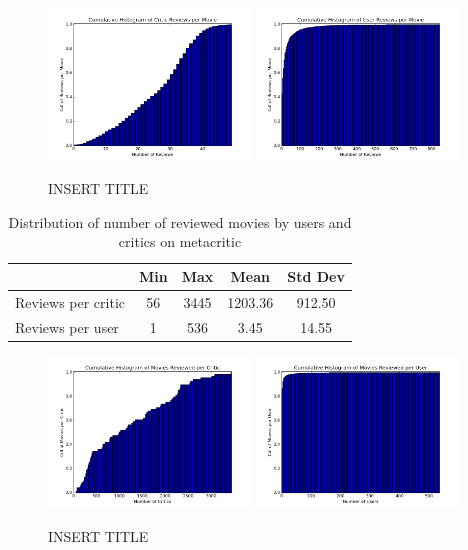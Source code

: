 \documentclass[12pt]{article}
\begin{document}
	 \begin{figure}[H]
	    \centering
	    \includegraphics[width=0.48\textwidth]{plots/plot_m_mov_top.png}
	    \includegraphics[width=0.48\textwidth]{plots/plot_m_mov_usr.png}
	    \caption{INSERT TITLE}
	    \label{fig:m_mov}
	\end{figure}


	\begin{table}[H]
	\centering
	 \caption{Distribution of number of reviewed movies by users and critics on metacritic}

	 \begin{tabular}{ l | c | c | c | c }
	 \hline
	 &  Min & Max & Mean & Std Dev  \\
	 \hline
	 Reviews per critic & 56 & 3445 & 1203.36 & 912.50 \\
	 Reviews per user & 1 & 536 & 3.45 & 14.55 \\
	 \hline
	 \end{tabular}
	 \end{table}


	 \begin{figure}[H]
	    \centering
	    \includegraphics[width=0.48\textwidth]{plots/plot_m_crit_top.png}
	    \includegraphics[width=0.48\textwidth]{plots/plot_m_crit_usr.png}
	    \caption{INSERT TITLE}
	    \label{fig:m_crit}
	\end{figure}
\end{document}
